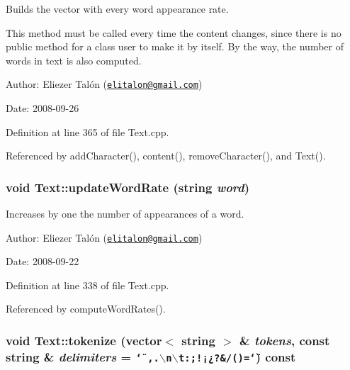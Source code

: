 Builds the vector with every word appearance rate. 

This method must be called every time the content changes, since there is no public method for a class user to make it by itself. By the way, the number of words in text is also computed.

\begin{Desc}
\item[Author:]Eliezer Talón (\href{mailto:elitalon@gmail.com}{\tt elitalon@gmail.com}) \end{Desc}
\begin{Desc}
\item[Date:]2008-09-26 \end{Desc}


Definition at line 365 of file Text.cpp.

Referenced by addCharacter(), content(), removeCharacter(), and Text().\hypertarget{class_text_7c2b1a540b470cb7aa37fb42070a674f}{
\subsubsection[updateWordRate]{\setlength{\rightskip}{0pt plus 5cm}void Text::updateWordRate (string {\em word})}}
\label{class_text_7c2b1a540b470cb7aa37fb42070a674f}


Increases by one the number of appearances of a word. 

\begin{Desc}
\item[Author:]Eliezer Talón (\href{mailto:elitalon@gmail.com}{\tt elitalon@gmail.com}) \end{Desc}
\begin{Desc}
\item[Date:]2008-09-22 \end{Desc}


Definition at line 338 of file Text.cpp.

Referenced by computeWordRates().\hypertarget{class_text_09f6b1e475da423ac81305500e05c7d6}{
\subsubsection[tokenize]{\setlength{\rightskip}{0pt plus 5cm}void Text::tokenize (vector$<$ string $>$ \& {\em tokens}, \/  const string \& {\em delimiters} = {\tt \char`\"{}~,.$\backslash$n$\backslash$t:;!¡¿?\&/()=\char`\"{}}) const}}
\label{class_text_09f6b1e475da423ac81305500e05c7d6}


